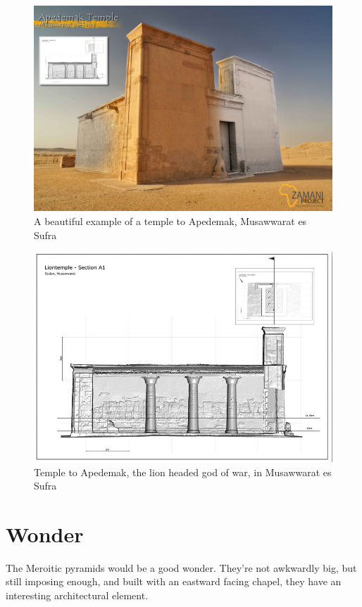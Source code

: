 \documentclass[a4paper,12pt]{scrreprt}
\begin{document}
\begin{figure}[H]
	\centering
	\includegraphics[width=\textwidth]{img/temple/apedemak_temple}
	\caption{A beautiful example of a temple to Apedemak, Musawwarat es Sufra}
\end{figure}

\begin{figure}[H]
	\centering
	\includegraphics[width=\textwidth]{img/temple/apedemak_temple_profile}
	\caption{Temple to Apedemak, the lion headed god of war, in Musawwarat es Sufra}
\end{figure}

\section{Wonder}

The Meroitic pyramids would be a good wonder. They’re not awkwardly big, but still imposing enough, and built with an eastward facing chapel, they have an interesting architectural element.
\end{document}
